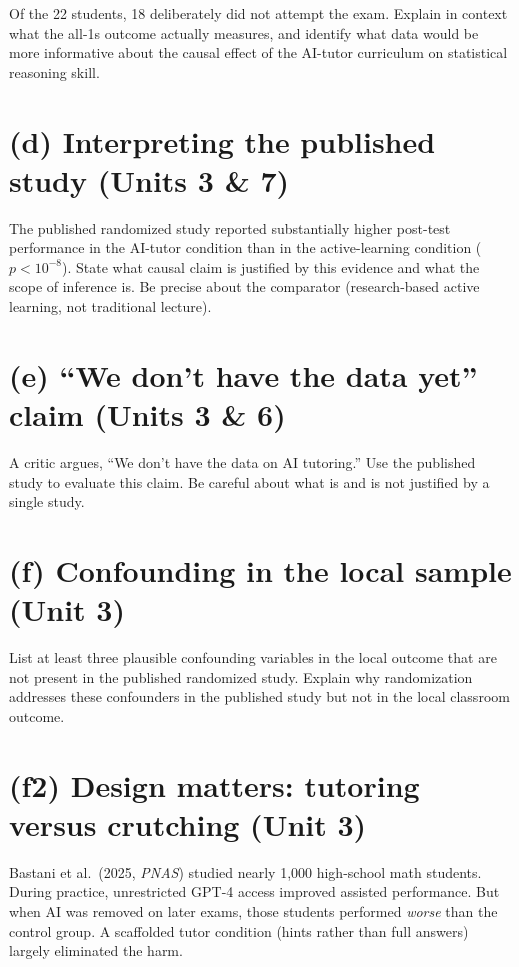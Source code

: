 \documentclass[11pt]{article}
\begin{document}
Of the 22 students, 18 deliberately did not attempt the exam.
Explain in context what the all-1s outcome actually measures, and
identify what data would be more informative about the causal effect
of the AI-tutor curriculum on statistical reasoning skill.

\section{(d) Interpreting the published study \textnormal{\small(Units 3 \& 7)}}

The published randomized study reported substantially higher post-test
performance in the AI-tutor condition than in the active-learning
condition ($p < 10^{-8}$). State what causal claim is justified by
this evidence and what the scope of inference is. Be precise about the
comparator (research-based active learning, not traditional lecture).

\section{(e) ``We don't have the data yet'' claim \textnormal{\small(Units 3 \& 6)}}

A critic argues, ``We don't have the data on AI tutoring.'' Use the
published study to evaluate this claim. Be careful about what is and
is not justified by a single study.

\section{(f) Confounding in the local sample \textnormal{\small(Unit 3)}}

List at least three plausible confounding variables in the local
outcome that are not present in the published randomized study.
Explain why randomization addresses these confounders in the
published study but not in the local classroom outcome.

\section{(f2) Design matters: tutoring versus crutching \textnormal{\small(Unit 3)}}

Bastani et al.\ (2025, \emph{PNAS}) studied nearly 1,000 high-school
math students. During practice, unrestricted GPT-4 access improved
assisted performance. But when AI was removed on later exams, those
students performed \emph{worse} than the control group. A scaffolded
tutor condition (hints rather than full answers) largely eliminated
the harm.
\end{document}
